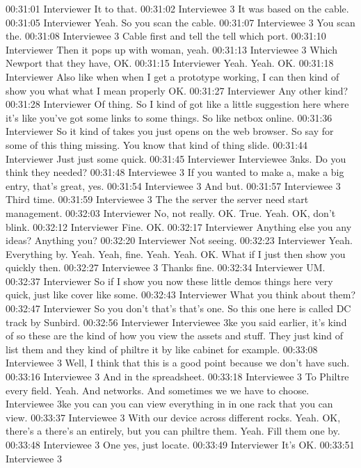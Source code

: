 00:31:01 Interviewer
It to that.
00:31:02 Interviewee 3
It was based on the cable.
00:31:05 Interviewer
Yeah. So you scan the cable.
00:31:07 Interviewee 3
You scan the.
00:31:08 Interviewee 3
Cable first and tell the tell which port.
00:31:10 Interviewer
Then it pops up with woman, yeah.
00:31:13 Interviewee 3
Which Newport that they have, OK.
00:31:15 Interviewer
Yeah. Yeah. OK.
00:31:18 Interviewer
Also like when when I get a prototype working, I can then kind of show you what what I mean properly OK.
00:31:27 Interviewer
Any other kind?
00:31:28 Interviewer
Of thing. So I kind of got like a little suggestion here where it's like you've got some links to some things. So like netbox online.
00:31:36 Interviewer
So it kind of takes you just opens on the web browser. So say for some of this thing missing. You know that kind of thing slide.
00:31:44 Interviewer
Just just some quick.
00:31:45 Interviewer
Interviewee 3nks. Do you think they needed?
00:31:48 Interviewee 3
If you wanted to make a, make a big entry, that's great, yes.
00:31:54 Interviewee 3
And but.
00:31:57 Interviewee 3
Third time.
00:31:59 Interviewee 3
The the server the server need start management.
00:32:03 Interviewer
No, not really. OK. True. Yeah. OK, don't blink.
00:32:12 Interviewer
Fine. OK.
00:32:17 Interviewer
Anything else you any ideas? Anything you?
00:32:20 Interviewer
Not seeing.
00:32:23 Interviewer
Yeah. Everything by. Yeah. Yeah, fine. Yeah. Yeah. OK. What if I just then show you quickly then.
00:32:27 Interviewee 3
Thanks fine.
00:32:34 Interviewer
UM.
00:32:37 Interviewer
So if I show you now these little demos things here very quick, just like cover like some.
00:32:43 Interviewer
What you think about them?
00:32:47 Interviewer
So you don't that's that's one. So this one here is called DC track by Sunbird.
00:32:56 Interviewer
Interviewee 3ke you said earlier, it's kind of so these are the kind of how you view the assets and stuff. They just kind of list them and they kind of philtre it by like cabinet for example.
00:33:08 Interviewee 3
Well, I think that this is a good point because we don't have such.
00:33:16 Interviewee 3
And in the spreadsheet.
00:33:18 Interviewee 3
To Philtre every field. Yeah. And networks. And sometimes we we have to choose. Interviewee 3ke you can you can view everything in in one rack that you can view.
00:33:37 Interviewee 3
With our device across different rocks. Yeah. OK, there's a there's an entirely, but you can philtre them. Yeah. Fill them one by.
00:33:48 Interviewee 3
One yes, just locate.
00:33:49 Interviewer
It's OK.
00:33:51 Interviewee 3
